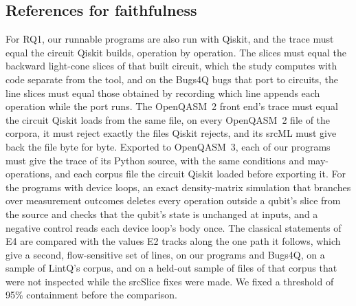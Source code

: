 \subsection{References for faithfulness}
For RQ1, our runnable programs are also run with Qiskit, and the trace must equal the circuit Qiskit builds, operation
by operation. The slices must equal the backward light-cone slices of that built circuit, which the study computes with
code separate from the tool, and on the Bugs4Q bugs that port to circuits, the line slices must equal those obtained by
recording which line appends each operation while the port runs. The OpenQASM~2 front end's trace must equal the circuit
Qiskit loads from the same file, on every OpenQASM~2 file of the corpora, it must reject exactly the files Qiskit
rejects, and its srcML must give back the file byte for byte. Exported to OpenQASM~3, each of our programs must give
the trace of its Python source, with the same conditions and may-operations, and each corpus file the circuit Qiskit
loaded before exporting it. For the programs with device loops, an exact density-matrix simulation that branches
over measurement outcomes deletes every operation outside a qubit's slice from the source and checks that the qubit's
state is unchanged at \numCfInputs{} inputs, and a negative control reads each device loop's body once. The classical
statements of E4 are compared with the values E2 tracks along the one path it follows, which give a second,
flow-sensitive set of lines, on our programs and Bugs4Q, on a sample of LintQ's corpus, and on a held-out sample of
\numSsHeldFiles{} files of that corpus that were not inspected while the srcSlice fixes were made. We fixed a
threshold of 95\% containment before the comparison.

